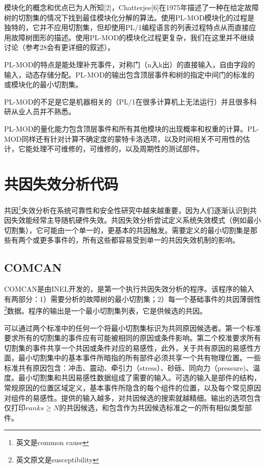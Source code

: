 \documentclass[cn,11pt,chinese]{elegantbook}
\begin{document}
{模块化的概念和优点已为人所知[2]，Chatterjee[6]在1975年描述了一种在给定故障树的切割集的情况下找到最佳模块化分解的算法。使用PL-MOD模块化的过程是独特的，它并不应用切割集，但却使用PL/1编程语言的列表过程特点从而直接应用故障树图形的描述。使用PL-MOD的模块化过程更复杂，我们在这里并不继续讨论（参考28会有更详细的叙述）。

PL-MOD的特点是能处理补充事件，对称门（n入k出）的直接输入，自由字段的输入，动态存储分配。PL-MOD的输出包含顶层事件和树的指定中间门的标准的或模块化的最小切割集。

PL-MOD的不足是它是机器相关的（PL/1在很多计算机上无法运行）并且很多科研从业人员并不熟悉。

PL-MOD的量化能力包含顶层事件和所有其他模块的出现概率和权重的计算。PL-MOD同样还有针对计算不确定度的蒙特卡洛选项，以及时间相关不可用性的估计，它能处理不可维修的，可维修的，以及周期性的测试部件。

\section{共因失效分析代码}

共因\footnote{英文是common cause}失效分析在系统可靠性和安全性研究中越来越重要，因为人们逐渐认识到共因失效能经常主导随机硬件失效。共因失效分析尝试定义系统失效模式（例如最小切割集），它可能由一个单一的，更基本的共因触发。需要定义的最小切割集是那些有两个或更多事件的，所有这些都容易受到单一的共因失效机制的影响。

\subsection{COMCAN}

COMCAN是由INEL开发的，是第一个执行共因失效分析的程序。该程序的输入有两部分：1）需要分析的故障树的最小切割集；2）每一个基础事件的共因薄弱性\footnote{英文原文是susceptibility}数据。程序的输出是一个最小切割集列表，它是供候选的共因。

可以通过两个标准中的任何一个将最小切割集标识为共同原因候选者。第一个标准要求所有的切割集的事件应有可能被相同的原因或条件影响。第二个校准要求所有切割集的事件共享一个共因或条件对应的易感性，此外，关于共有原因的易感性方面，最小切割集中的基本事件所暗指的所有部件必须共享一个共有物理位置。一些标准共有原因包含：冲击、震动、牵引力（stress）、砂砾、同向力（pressure)、温度。最小切割集和共因易感性数据组成了需要的输入。可选的输入是部件的结构，常规原因的位置区域定义，基本事件所隐含的每个组件的位置，以及每个常见原因对组件的易感性。提供的输入越多，对共因候选的搜索就越精细。输出的选项包含仅打印$ranks \geq N$的共因候选，和包含作为共因候选标准之一的所有相似类型部件。

}
\end{document}
